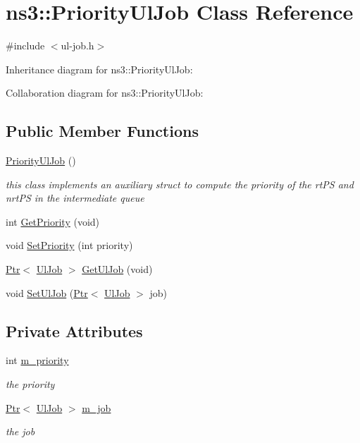 \hypertarget{classns3_1_1PriorityUlJob}{}\section{ns3\+:\+:Priority\+Ul\+Job Class Reference}
\label{classns3_1_1PriorityUlJob}


{\ttfamily \#include $<$ul-\/job.\+h$>$}



Inheritance diagram for ns3\+:\+:Priority\+Ul\+Job\+:


Collaboration diagram for ns3\+:\+:Priority\+Ul\+Job\+:
\subsection*{Public Member Functions}
\begin{DoxyCompactItemize}
\item 
\hyperlink{classns3_1_1PriorityUlJob_aad82a2b8901a1c16e741ef04ae3eae13}{Priority\+Ul\+Job} ()
\begin{DoxyCompactList}\small\item\em this class implements an auxiliary struct to compute the priority of the rt\+PS and nrt\+PS in the intermediate queue \end{DoxyCompactList}\item 
int \hyperlink{classns3_1_1PriorityUlJob_a5fdea32cfa46fe1b6ce07fada73fb915}{Get\+Priority} (void)
\item 
void \hyperlink{classns3_1_1PriorityUlJob_a8445d5e3179bb90a0c4de74be5973077}{Set\+Priority} (int priority)
\item 
\hyperlink{classns3_1_1Ptr}{Ptr}$<$ \hyperlink{classns3_1_1UlJob}{Ul\+Job} $>$ \hyperlink{classns3_1_1PriorityUlJob_aa73d9dcd935dc6643228f798a18288a9}{Get\+Ul\+Job} (void)
\item 
void \hyperlink{classns3_1_1PriorityUlJob_a16b381e7ae309d61ce6a3833454099ae}{Set\+Ul\+Job} (\hyperlink{classns3_1_1Ptr}{Ptr}$<$ \hyperlink{classns3_1_1UlJob}{Ul\+Job} $>$ job)
\end{DoxyCompactItemize}
\subsection*{Private Attributes}
\begin{DoxyCompactItemize}
\item 
int \hyperlink{classns3_1_1PriorityUlJob_ad8ba9e3d6956f3576b372b9fc447b801}{m\+\_\+priority}
\begin{DoxyCompactList}\small\item\em the priority \end{DoxyCompactList}\item 
\hyperlink{classns3_1_1Ptr}{Ptr}$<$ \hyperlink{classns3_1_1UlJob}{Ul\+Job} $>$ \hyperlink{classns3_1_1PriorityUlJob_ab1cdbdf7ae5ce579673d46682b2eadc1}{m\+\_\+job}
\begin{DoxyCompactList}\small\item\em the job \end{DoxyCompactList}\end{DoxyCompactItemize}
